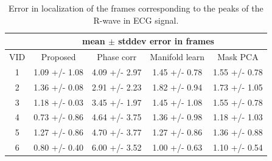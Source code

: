 \documentclass[journal]{IEEEtran}
\begin{document}
%	
\begin{table}[h]
\begin{minipage}[t]{0.95\linewidth}
\centering
\caption{Error in localization of the frames corresponding to the peaks of the R-wave in ECG signal.}
\setlength\tabcolsep{3pt} 
\begin{tabular}{|c|c|c|c|c|}
\hline
\multicolumn{1}{|l|}{} & \multicolumn{4}{c|}{mean $\pm$ stddev error in frames} \\ \hline
VID & Proposed & Phase corr\cite{Karadayi2006} & Manifold learn\cite{Wachinger2012} & Mask PCA\cite{Panayiotou2014} \\ \hline
1 & 1.09 +/- 1.08 & 4.09 +/- 2.97 & 1.45 +/- 0.78 & 1.55 +/- 0.78 \\ \hline
2 & 1.36 +/- 0.08 & 2.91 +/- 2.23 & 1.82 +/- 0.94 & 1.73 +/- 1.05 \\ \hline
3 & 1.18 +/- 0.03 & 3.45 +/- 1.97 & 1.45 +/- 1.08 & 1.55 +/- 0.78 \\ \hline
4 & 0.73 +/- 0.86 & 4.64 +/- 3.75 & 1.36 +/- 0.98 & 1.18 +/- 1.03 \\ \hline
5 & 1.27 +/- 0.86 & 4.70 +/- 3.77 & 1.27 +/- 0.86 & 1.36 +/- 0.88 \\ \hline
6 & 0.80 +/- 0.40 & 6.00 +/- 3.52 & 1.00 +/- 0.63 & 1.10 +/- 0.54 \\ \hline
\end{tabular}
\label{table:R_peak_localization}
\end{minipage}
\end{table}
%	
\end{document}
